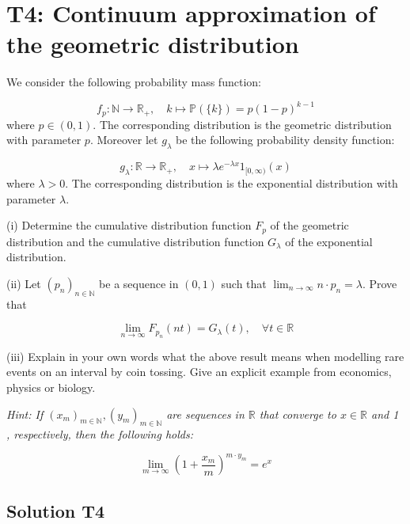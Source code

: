 \documentclass[12pt]{article}
\begin{document}
\section*{T4: Continuum approximation of the geometric distribution}

We consider the following probability mass function:

\[
f_{p}: \mathbb{N} \rightarrow \mathbb{R}_{+}, \quad k \mapsto \mathbb{P}(\{k\})=p(1-p)^{k-1}
\]
where $p \in(0,1)$. The corresponding distribution is the geometric distribution with parameter $p$. Moreover let $g_{\lambda}$ be the following probability density function:

$$
g_{\lambda}: \mathbb{R} \rightarrow \mathbb{R}_{+}, \quad x \mapsto \lambda e^{-\lambda x} 1_{[0, \infty)}(x)
$$
where $\lambda>0$. The corresponding distribution is the exponential distribution with parameter $\lambda$.

(i) Determine the cumulative distribution function $F_{p}$ of the geometric distribution and the cumulative distribution function $G_{\lambda}$ of the exponential distribution.

(ii) Let $\left(p_{n}\right)_{n \in \mathbb{N}}$ be a sequence in $(0,1)$ such that $\lim _{n \rightarrow \infty} n \cdot p_{n}=\lambda$. Prove that

$$
\lim _{n \rightarrow \infty} F_{p_{n}}(n t)=G_{\lambda}(t), \quad \forall t \in \mathbb{R}
$$


(iii) Explain in your own words what the above result means when modelling rare events on an interval by coin tossing. Give an explicit example from economics, physics or biology.

\textit{
Hint: If $\left(x_{m}\right)_{m \in \mathbb{N}},\left(y_{m}\right)_{m \in \mathbb{N}}$ are sequences in $\mathbb{R}$ that converge to $x \in \mathbb{R}$ and 1 , respectively, then the following holds:
}

$$
\lim _{m \rightarrow \infty}\left(1+\frac{x_{m}}{m}\right)^{m \cdot y_{m}}=e^{x}
$$


\subsection*{Solution T4}   
\end{document}
